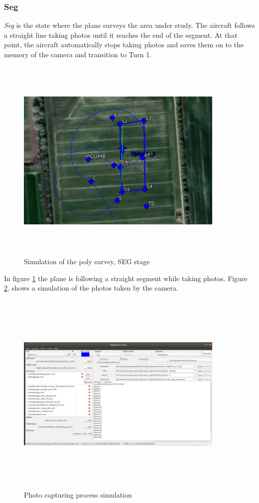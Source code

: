\subsubsection{Seg}
\textit{Seg} is the state where the plane surveys the area under study. The aircraft follows a straight line taking photos until it reaches the end of the segment. At that point, the aircraft automatically stops taking photos and saves them on to the memory of the camera and transition to Turn 1.
\begin{figure}[H]
\centering
\includegraphics[width=10cm,height=10cm,keepaspectratio]{imagenes/SEG.png}
\caption{Simulation of the poly survey, SEG stage}
\label{fig:SEG_stage}
\end{figure}

In figure \ref{fig:SEG_stage} the plane is following a straight segment while taking photos. Figure \ref{fig:Photos}, shows a simulation of the photos taken by the camera.
\begin{figure}[H]
\centering
\includegraphics[width=10cm,height=10cm,keepaspectratio]{imagenes/Photos.png}
\caption{Photo capturing process simulation}
\label{fig:Photos}
\end{figure}

